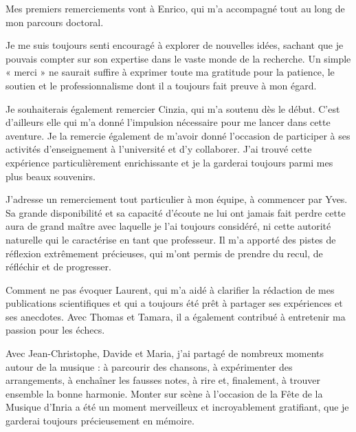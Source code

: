 
\begin{remerciements}


Mes premiers remerciements vont à Enrico, qui m'a accompagné tout au long de mon parcours doctoral.

Je me suis toujours senti encouragé à explorer de nouvelles idées, sachant que je pouvais compter sur son expertise dans le vaste monde de la recherche. Un simple « merci » ne saurait suffire à exprimer toute ma gratitude pour la patience, le soutien et le professionnalisme dont il a toujours fait preuve à mon égard.

Je souhaiterais également remercier Cinzia, qui m'a soutenu dès le début. C'est d'ailleurs elle qui m'a donné l'impulsion nécessaire pour me lancer dans cette aventure. Je la remercie également de m'avoir donné l'occasion de participer à ses activités d'enseignement à l'université et d'y collaborer. J'ai trouvé cette expérience particulièrement enrichissante et je la garderai toujours parmi mes plus beaux souvenirs.

J'adresse un remerciement tout particulier à mon équipe, à commencer par Yves. Sa grande disponibilité et sa capacité d'écoute ne lui ont jamais fait perdre cette aura de grand maître avec laquelle je l'ai toujours considéré, ni cette autorité naturelle qui le caractérise en tant que professeur. Il m'a apporté des pistes de réflexion extrêmement précieuses, qui m'ont permis de prendre du recul, de réfléchir et de progresser.

Comment ne pas évoquer Laurent, qui m'a aidé à clarifier la rédaction de mes publications scientifiques et qui a toujours été prêt à partager ses expériences et ses anecdotes. Avec Thomas et Tamara, il a également contribué à entretenir ma passion pour les échecs.

Avec Jean-Christophe, Davide et Maria, j'ai partagé de nombreux moments autour de la musique : à parcourir des chansons, à expérimenter des arrangements, à enchaîner les fausses notes, à rire et, finalement, à trouver ensemble la bonne harmonie. Monter sur scène à l'occasion de la Fête de la Musique d'Inria a été un moment merveilleux et incroyablement gratifiant, que je garderai toujours précieusement en mémoire.


\end{remerciements}
